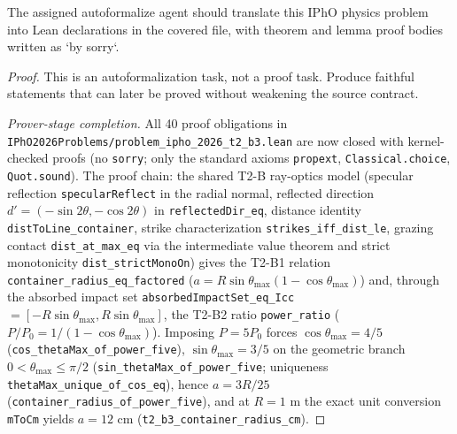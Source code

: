 \begin{theorem}
\label{thm:physics:ipho_2026_t2_b3:target}
\leanok
The assigned autoformalize agent should translate this IPhO physics problem into Lean declarations in the covered file, with theorem and lemma proof bodies written as `by sorry`.
\end{theorem}
\begin{proof}
\leanok
This is an autoformalization task, not a proof task. Produce faithful statements that can later be proved without weakening the source contract.

\emph{Prover-stage completion.} All 40 proof obligations in
\texttt{IPhO2026Problems/problem\_ipho\_2026\_t2\_b3.lean} are now closed with
kernel-checked proofs (no \texttt{sorry}; only the standard axioms
\texttt{propext}, \texttt{Classical.choice}, \texttt{Quot.sound}).  The proof
chain: the shared T2-B ray-optics model (specular reflection
\texttt{specularReflect} in the radial normal, reflected direction
$d' = (-\sin 2\theta, -\cos 2\theta)$ in \texttt{reflectedDir\_eq},
distance identity \texttt{distToLine\_container}, strike characterization
\texttt{strikes\_iff\_dist\_le}, grazing contact \texttt{dist\_at\_max\_eq} via the
intermediate value theorem and strict monotonicity \texttt{dist\_strictMonoOn})
gives the T2-B1 relation \texttt{container\_radius\_eq\_factored}
($a = R \sin\theta_{\max}(1 - \cos\theta_{\max})$) and, through the absorbed
impact set \texttt{absorbedImpactSet\_eq\_Icc} $= [-R\sin\theta_{\max},
R\sin\theta_{\max}]$, the T2-B2 ratio \texttt{power\_ratio}
($P/P_0 = 1/(1-\cos\theta_{\max})$).  Imposing $P = 5 P_0$ forces
$\cos\theta_{\max} = 4/5$ (\texttt{cos\_thetaMax\_of\_power\_five}),
$\sin\theta_{\max} = 3/5$ on the geometric branch $0 < \theta_{\max} \le \pi/2$
(\texttt{sin\_thetaMax\_of\_power\_five}; uniqueness
\texttt{thetaMax\_unique\_of\_cos\_eq}), hence
$a = 3R/25$ (\texttt{container\_radius\_of\_power\_five}), and at $R = 1$ m the
exact unit conversion \texttt{mToCm} yields $a = 12$ cm
(\texttt{t2\_b3\_container\_radius\_cm}).
\end{proof}
